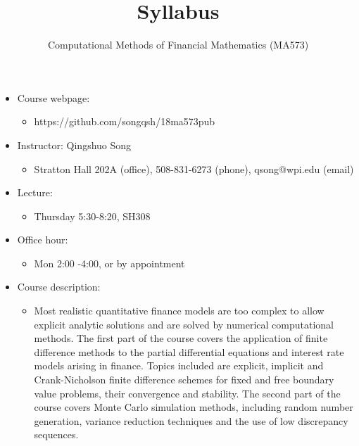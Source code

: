 \documentclass[11pt]{amsart}
\title{Syllabus}
\author{Computational Methods of Financial Mathematics (MA573)}
\begin{document}
\maketitle

\begin{itemize}
 
 \item Course webpage: 
\begin{itemize}
 \item  https://github.com/songqsh/18ma573pub
\end{itemize}

 \item Instructor: Qingshuo Song 
\begin{itemize}
 \item  Stratton Hall 202A (office),  508-831-6273 (phone), qsong@wpi.edu (email)
\end{itemize}
\item Lecture:
\begin{itemize}
 \item Thursday 5:30-8:20,  SH308
\end{itemize}

 \item Office hour: 
\begin{itemize}
 \item Mon 2:00 -4:00, or by appointment
\end{itemize}

\item Course description:
\begin{itemize}
 \item Most realistic quantitative finance models are too complex to allow explicit analytic solutions and are solved by numerical computational methods. The first part of the course covers the application of finite difference methods to the partial differential equations and interest rate models arising in finance. Topics included are explicit, implicit and Crank-Nicholson finite difference schemes for fixed and free boundary value problems, their convergence and stability. The second part of the course covers Monte Carlo simulation methods, including random number generation, variance reduction techniques and the use of low discrepancy sequences. 
\end{itemize}


\end{itemize}
\end{document}
